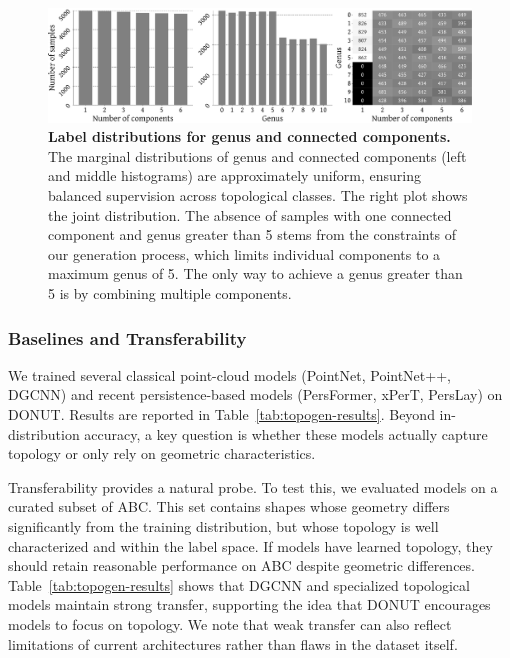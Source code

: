 \begin{figure}
  \centering
  \includegraphics[width=\linewidth]{figs/topogen/label_distribution.pdf}
  \caption{\textbf{Label distributions for genus and connected components.} The marginal distributions of genus and connected components (left and middle histograms) are approximately uniform, ensuring balanced supervision across topological classes. The right plot shows the joint distribution. The absence of samples with one connected component and genus greater than 5 stems from the constraints of our generation process, which limits individual components to a maximum genus of 5. The only way to achieve a genus greater than 5 is by combining multiple components.}
  \label{fig:topogen-properties}
\end{figure}

\subsubsection{Baselines and Transferability}
\label{sssec:topogen-transferability}

We trained several classical point-cloud models (PointNet, PointNet++, DGCNN) and recent persistence-based models (PersFormer, xPerT, PersLay) on DONUT. Results are reported in Table~\ref{tab:topogen-results}. Beyond in-distribution accuracy, a key question is whether these models actually capture topology or only rely on geometric characteristics.

Transferability provides a natural probe. To test this, we evaluated models on a curated subset of ABC. This set contains shapes whose geometry differs significantly from the training distribution, but whose topology is well characterized and within the label space. If models have learned topology, they should retain reasonable performance on ABC despite geometric differences. Table~\ref{tab:topogen-results} shows that DGCNN and specialized topological models maintain strong transfer, supporting the idea that DONUT encourages models to focus on topology. We note that weak transfer can also reflect limitations of current architectures rather than flaws in the dataset itself.

